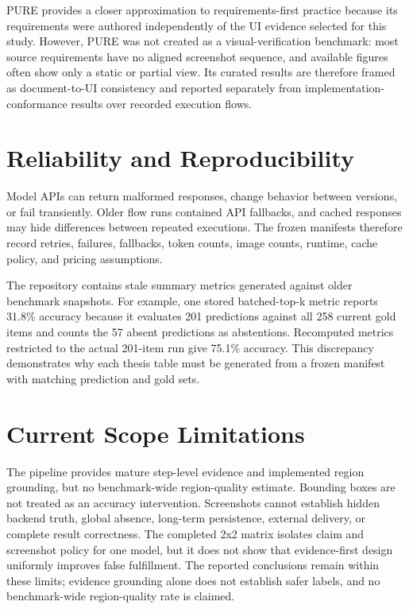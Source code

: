 PURE provides a closer approximation to requirements-first practice because its
requirements were authored independently of the UI evidence selected for this
study. However, PURE was not created as a visual-verification benchmark: most
source requirements have no aligned screenshot sequence, and available figures
often show only a static or partial view. Its curated results are therefore
framed as document-to-UI consistency and reported separately from
implementation-conformance results over recorded execution flows.

\section{Reliability and Reproducibility}\label{reliability-and-reproducibility}

Model APIs can return malformed responses, change behavior between versions, or fail transiently. Older flow runs contained API fallbacks, and cached responses may hide differences between repeated executions. The frozen manifests therefore record retries, failures, fallbacks, token counts, image counts, runtime, cache policy, and pricing assumptions.

The repository contains stale summary metrics generated against older benchmark snapshots. For example, one stored batched-top-k metric reports 31.8\% accuracy because it evaluates 201 predictions against all 258 current gold items and counts the 57 absent predictions as abstentions. Recomputed metrics restricted to the actual 201-item run give 75.1\% accuracy. This discrepancy demonstrates why each thesis table must be generated from a frozen manifest with matching prediction and gold sets.

\section{Current Scope Limitations}\label{current-scope-limitations}

The pipeline provides mature step-level evidence and implemented region
grounding, but no benchmark-wide region-quality estimate. Bounding boxes are
not treated as an accuracy intervention. Screenshots cannot
establish hidden backend truth, global absence, long-term persistence, external
delivery, or complete result correctness. The completed 2x2 matrix isolates
claim and screenshot policy for one model, but it does not show that
evidence-first design uniformly improves false fulfillment. The reported
conclusions remain within these limits; evidence grounding alone does not
establish safer labels, and no benchmark-wide region-quality rate is claimed.

